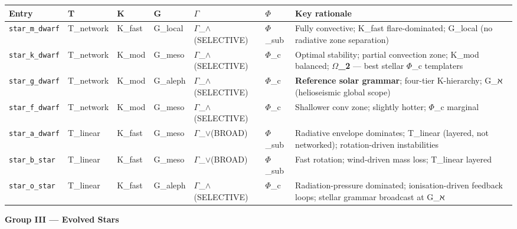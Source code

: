 \documentclass[12pt,a4paper]{article}
\begin{document}
\begin{table}[htbp]
\centering
\small
{}
\begin{tabularx}{\textwidth}{>{\centering\arraybackslash}X >{\centering\arraybackslash}X >{\centering\arraybackslash}X >{\centering\arraybackslash}X >{\centering\arraybackslash}X >{\centering\arraybackslash}X >{\centering\arraybackslash}X}
\toprule
\rowcolor{gray!25}\textbf{Entry} & \textbf{T} & \textbf{K} & \textbf{G} & \textbf{$\Gamma$} & \textbf{$\Phi$} & \textbf{Key rationale} \\
\midrule
\rowcolors{1}{white}{gray!10}
\texttt{star\_m\_dwarf} & T\_network & K\_fast & G\_local & $\Gamma$\_$\land$(SELECTIVE) & $\Phi$\_sub & Fully convective; K\_fast flare-dominated; G\_local (no radiative zone separation) \\
\texttt{star\_k\_dwarf} & T\_network & K\_mod & G\_meso & $\Gamma$\_$\land$(SELECTIVE) & $\Phi$\_c & Optimal stability; partial convection zone; K\_mod balanced; \textbf{$\Omega$\_2} --- best stellar $\Phi$\_c templaters \\
\texttt{star\_g\_dwarf} & T\_network & K\_mod & G\_aleph & $\Gamma$\_$\land$(SELECTIVE) & $\Phi$\_c & \textbf{Reference solar grammar}; four-tier K-hierarchy; G\_ℵ (helioseismic global scope) \\
\texttt{star\_f\_dwarf} & T\_network & K\_mod & G\_meso & $\Gamma$\_$\land$(SELECTIVE) & $\Phi$\_c & Shallower conv zone; slightly hotter; $\Phi$\_c marginal \\
\texttt{star\_a\_dwarf} & T\_linear & K\_fast & G\_meso & $\Gamma$\_$\lor$(BROAD) & $\Phi$\_sub & Radiative envelope dominates; T\_linear (layered, not networked); rotation-driven instabilities \\
\texttt{star\_b\_star} & T\_linear & K\_fast & G\_meso & $\Gamma$\_$\lor$(BROAD) & $\Phi$\_sub & Fast rotation; wind-driven mass loss; T\_linear layered \\
\texttt{star\_o\_star} & T\_linear & K\_fast & G\_aleph & $\Gamma$\_$\land$(SELECTIVE) & $\Phi$\_c & Radiation-pressure dominated; ionisation-driven feedback loops; stellar grammar broadcast at G\_ℵ \\
\bottomrule
\end{tabularx}
\end{table}

\textbf{Group III --- Evolved Stars}
\end{document}
